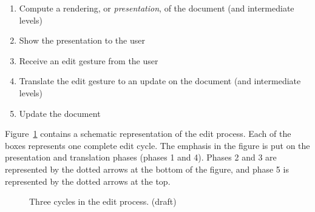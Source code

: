 \begin{enumerate}
\item Compute a rendering, or {\it presentation}, of the document (and intermediate levels)
\item Show the presentation to the user
\item Receive an edit gesture from the user
\item Translate the edit gesture to an update on the document (and intermediate levels)
\item Update the document
\end{enumerate}

Figure~\ref{simpleeditprocess} contains a schematic representation of the edit process. Each of the boxes represents one complete edit cycle. The emphasis in the figure is put on the presentation and translation phases (phases 1 and 4). Phases 2 and 3 are represented by the dotted arrows at the bottom of the figure, and phase 5 is represented by the dotted arrows at the top.

\begin{figure}
\begin{small}
\begin{center}
\begin{center}
\begin{scriptsize}
\end{scriptsize}
\end{center}\caption{Three cycles in the edit process. (draft)}\label{simpleeditprocess} 
\end{center}
\end{small}
\end{figure}

